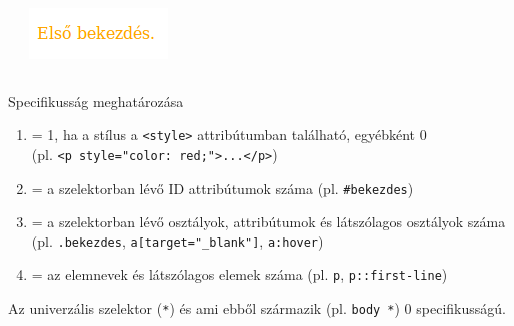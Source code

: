 \begin{frame}
  \begin{exampleblock}{}
    \scriptsize
    
  \end{exampleblock}
  \begin{columns}[T]
      \begin{exampleblock}{}
        \scriptsize
        
      \end{exampleblock}
      \includegraphics[width=.66\textwidth]{utkozes2.png}
  \end{columns} 
\end{frame}

\begin{frame}
  Specifikusság meghatározása
  \begin{enumerate}
    \renewcommand{\theenumi}{\Alph{enumi}}
    \item = 1, ha a stílus a \texttt{<style>} attribútumban található, egyébként 0\\(pl. \texttt{<p style="color: red;">...</p>})
    \item = a szelektorban lévő ID attribútumok száma (pl. \texttt{\#bekezdes})
    \item = a szelektorban lévő osztályok, attribútumok és látszólagos osztályok száma\\(pl. \texttt{.bekezdes}, \texttt{a[target="\_blank"]}, \texttt{a:hover})
    \item = az elemnevek és látszólagos elemek száma (pl. \texttt{p}, \texttt{p::first-line})
  \end{enumerate}
  Az univerzális szelektor (\texttt{*}) és ami ebből származik (pl. \texttt{body *}) 0 specifikusságú.
\end{frame}

